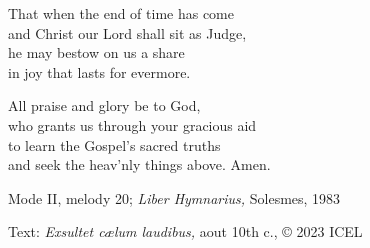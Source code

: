 \hymn



\begin{underhymnverse}
  That when the end of time has come\\
  and Christ our Lord shall sit as Judge,\\
  he may bestow on us a share\\
  in joy that lasts for evermore.

  All praise and glory be to God,\\
  who grants us through your gracious aid\\
  to learn the Gospel’s sacred truths\\
  and seek the heav’nly things above. Amen.
\end{underhymnverse}

\begin{hymnsource}
Mode II, melody 20; \emph{Liber Hymnarius,} Solesmes, 1983

Text: \emph{Exsultet cælum laudibus,} aout 10th c., © 2023 ICEL
\end{hymnsource}
